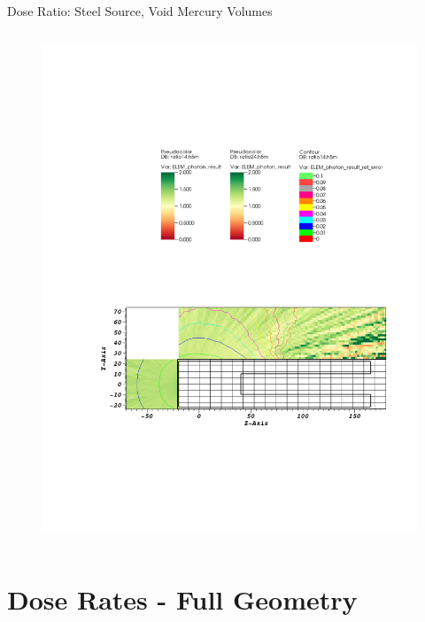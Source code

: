 \documentclass{beamer}
\begin{document}
\begin{frame}{Dose Ratio: Steel Source, Void Mercury Volumes}
\begin{columns}[T]
\begin{figure}
                \includegraphics[scale=0.49,trim={20cm 16.5cm 7cm 6cm},clip]{figs/ratio_steel_void.pdf}
        \end{figure}

\end{columns}
\end{frame}

\section{Dose Rates - Full Geometry}
\end{document}
